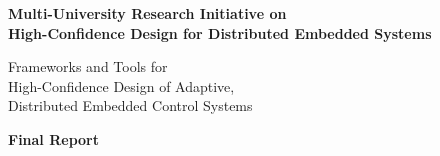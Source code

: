
                \begin{center}
                 \begin{indentation}{0pt}{0pt}{0pt}
                   \textbf{{\large Multi-University Research Initiative on \\
                       High-Confidence Design for Distributed Embedded Systems}}
                 \end{indentation}
               \end{center}

               \begin{center}
                 \begin{indentation}{0pt}{0pt}{0pt}

                 \end{indentation}
               \end{center}

               \begin{center}
                 \begin{indentation}{0pt}{0pt}{0pt}
                   {\LARGE Frameworks and Tools for \\
                       High-Confidence Design of Adaptive, \\
                       Distributed Embedded Control Systems}
                 \end{indentation}
               \end{center}

               \begin{center}
                 \begin{indentation}{0pt}{0pt}{0pt}
                   \textbf{{\large Final Report}}
                 \end{indentation}
               \end{center}

               \begin{center}
                 \begin{indentation}{0pt}{0pt}{0pt}

                 \end{indentation}
               \end{center}

               \begin{center}
                 \begin{indentation}{0pt}{0pt}{0pt}
                 \end{indentation}
               \end{center} 

